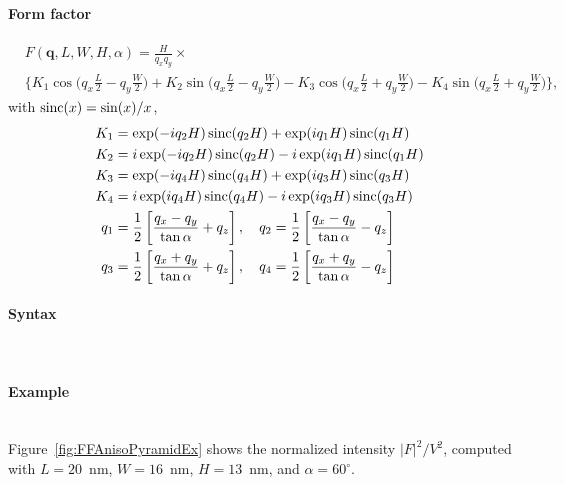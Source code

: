 \paragraph{Form factor}
\begin{align*}
&F(\mathbf{q}, L, W, H, \alpha)=
\frac{H}{q_xq_y} \times \\
&\Big\{
K_1\cos\Big(q_x \frac{L}{2} -q_y \frac{W}{2}\Big)+  K_2 \sin \Big (q_x
\frac{L}{2}- q_y \frac{W}{2}\Big) - K_3 \cos \Big (q_x \frac{L}{2} +q_y \frac{W}{2}\Big)-
K_4 \sin \Big (q_x \frac{L}{2} + q_y \frac{W}{2}\Big)
\Big\},
\end{align*}
with $\operatorname{sinc}(x)=\sin(x)/x$,
\begin{align*}
K_1 &= \exp(-i q_2 H) \operatorname{sinc}(q_2 H) + \exp(iq_1 H) \operatorname{sinc}(q_1 H) \\
K_2 &= i \exp(-iq_2 H) \operatorname{sinc}(q_2 H) -i \exp(iq_1 H) \operatorname{sinc}(q_1 H) \\
K_3 &= \exp(-iq_4 H) \operatorname{sinc}(q_4 H) + \exp(iq_3 H) \operatorname{sinc}(q_3 H) \\
K_4 &= i \exp(i q_4 H) \operatorname{sinc}(q_4 H) -i \exp(iq_3 H) \operatorname{sinc}(q_3 H)\\
q_1 &= \frac{1}{2}\left[\frac{q_x -q_y}{\tan \alpha} +q_z \right],\quad q_2 = \frac{1}{2}\left[\frac{q_x -q_y}{\tan \alpha} -q_z \right]\\
q_3 &= \frac{1}{2}\left[\frac{q_x +q_y}{\tan \alpha} +q_z \right] , \quad q_4 = \frac{1}{2}\left[\frac{q_x +q_y}{\tan \alpha} -q_z \right]
\end{align*}

\paragraph{Syntax}\strut\\

\paragraph{Example}\strut\\
Figure~\ref{fig:FFAnisoPyramidEx} shows the normalized intensity
$|F|^2/V^2$, computed with $L=20$~nm, $W=16$~nm, $H=13$~nm, and
$\alpha=60^{\circ}$.

